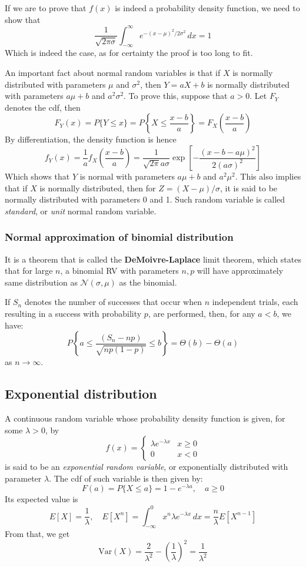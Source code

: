 If we are to prove that $f(x)$ is indeed a probability density function, we need to show that $$\frac{1}{\sqrt{ 2\pi \sigma}}\int_{-\infty}^{\infty} e^{-(x-\mu)^{2}/2\sigma^{2}} \, dx=1 $$
Which is indeed the case, as for certainty the proof is too long to fit. 

An important fact about normal random variables is that if $X$ is normally distributed with parameters $\mu$ and $\sigma^{2}$, then $Y=aX+b$ is normally distributed with parameters $a\mu+b$ and $a^{2}\sigma^{2}$. To prove this, suppose that $a>0$. Let $F_{Y}$ denotes the cdf, then
$$F_{Y}(x)=P\{ Y\leq x \}=P\left\{  X\leq \frac{x-b}{a}  \right\} = F_{{X}}\left( \frac{x-b}{a} \right)$$
By differentiation, the density function is hence $$f_{Y}(x)=\frac{1}{a}f_{{X}} \left( \frac{x-b}{a} \right)= \frac{1}{\sqrt{ 2\pi }a\sigma}\exp{\left[  -\frac{(x-b-a\mu)^{2}}{2(a\sigma)^{2}} \right]}$$
Which shows that $Y$ is normal with parameters $a\mu+b$ and $a^{2}\mu^{2}$. This also implies that if $X$ is normally distributed, then for $Z=(X-\mu)/\sigma$, it is said to be normally distributed with parameters 0 and 1. Such random variable is called \textit{standard}, or \textit{unit} normal random variable.   
\subsubsection{Normal approximation of binomial distribution}
It is a theorem that is called the \textbf{DeMoivre-Laplace} limit theorem, which states that for large $n$, a binomial RV with parameters $n,p$ will have approximately same distribution as $\mathcal{N}(\sigma,\mu)$ as the binomial. 
\begin{theorem}
    If $S_{n}$ denotes the number of successes that occur when $n$ independent trials, each resulting in a success with probability $p$, are performed, then, for any $a<b$, we have: $$P\left\{ a\leq \frac{(S_{n}-np)}{\sqrt{ np(1-p) }} \leq b  \right\}=\Theta(b)-\Theta(a)$$
     as $n\to \infty$. 
\end{theorem}
\subsection{Exponential distribution}
A continuous random variable whose probability density function is given, for some $\lambda>0$, by $$f(x)=\begin{cases}
    \lambda e^{-\lambda x} & x \geq 0 \\
    0 & x < 0
    \end{cases}$$
    is said to be an \textit{exponential random variable}, or exponentially distributed with parameter $\lambda$. The cdf of such variable is then given by: $$F(a)=P\{ X\leq a \}=1-e^{-\lambda a}, \quad a \geq 0$$
    Its expected value is $$E[X]=\frac{1}{\lambda},\quad E[X^{n}]= \int_{-\infty}^{0} x^{n}\lambda e^{-\lambda x} \, dx= \frac{n}{\lambda}E[X^{n-1}] $$
    From that, we get $$\mathrm{Var}(X)=\frac{2}{\lambda^{2}}-\left( \frac{1}{\lambda} \right)^{2}=\frac{1}{\lambda^{2}}$$
